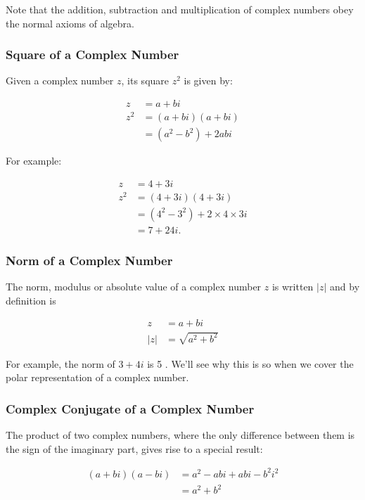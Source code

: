 \documentclass[10pt]{article}
\begin{document}
Note that the addition, subtraction and multiplication of complex numbers obey the normal axioms of algebra.

\subsubsection{Square of a Complex Number}
Given a complex number $z$, its square $z^{2}$ is given by:

$$
\begin{aligned}
z & =a+b i \\
z^{2} & =(a+b i)(a+b i) \\
& =\left(a^{2}-b^{2}\right)+2 a b i
\end{aligned}
$$

For example:

$$
\begin{aligned}
z & =4+3 i \\
z^{2} & =(4+3 i)(4+3 i) \\
& =\left(4^{2}-3^{2}\right)+2 \times 4 \times 3 i \\
& =7+24 i .
\end{aligned}
$$

\subsubsection{Norm of a Complex Number}
The norm, modulus or absolute value of a complex number $z$ is written $|z|$ and by definition is

$$
\begin{aligned}
z & =a+b i \\
|z| & =\sqrt{a^{2}+b^{2}}
\end{aligned}
$$

For example, the norm of $3+4 i$ is 5 . We'll see why this is so when we cover the polar representation of a complex number.

\subsubsection{Complex Conjugate of a Complex Number}
The product of two complex numbers, where the only difference between them is the sign of the imaginary part, gives rise to a special result:

$$
\begin{aligned}
(a+b i)(a-b i) & =a^{2}-a b i+a b i-b^{2} i^{2} \\
& =a^{2}+b^{2}
\end{aligned}
$$
\end{document}
